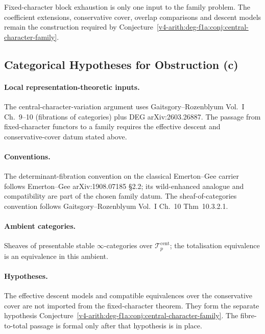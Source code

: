 \begin{remark}
\label{v4-arith:deg-f1a:rem:fixed-vs-varying}
Fixed-character block exhaustion is only one input to the family
problem. The coefficient extensions, conservative cover, overlap
comparisons and descent models remain the construction required
by Conjecture~\ref{v4-arith:deg-f1a:conj:central-character-family}.
\end{remark}

\subsection{Categorical Hypotheses for Obstruction (c)}

\paragraph{Local representation-theoretic inputs.} The central-character-variation
argument uses Gaitsgory--Rozenblyum Vol.~I Ch.~9--10 (fibrations
of categories) plus DEG arXiv:2603.26887. The passage from fixed-character functors to a family requires
the effective descent and conservative-cover datum stated above.

\paragraph{Conventions.} The determinant-fibration
convention on the classical Emerton--Gee carrier follows
Emerton--Gee arXiv:1908.07185 \S 2.2; its wild-enhanced analogue
and compatibility are part of the chosen family datum. The sheaf-of-categories
convention follows Gaitsgory--Rozenblyum Vol.~I Ch.~10 Thm~10.3.2.1.

\paragraph{Ambient categories.} Sheaves of presentable
stable \(\infty\)-categories over \(\mathcal{T}^{\mathrm{cent}}_{p}\);
the totalisation equivalence is an equivalence in this ambient.

\paragraph{Hypotheses.} The effective descent models and compatible
equivalences over the conservative cover are not imported from the
fixed-character theorem. They form the separate hypothesis
Conjecture~\ref{v4-arith:deg-f1a:conj:central-character-family}.  The
fibre-to-total passage is formal only after that hypothesis is in
place. 

